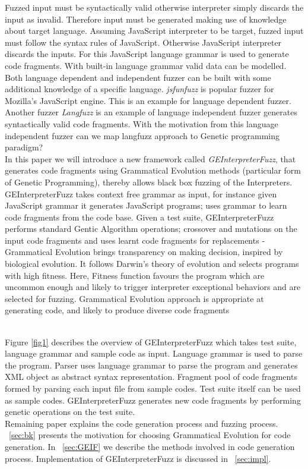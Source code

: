 \documentclass{sig-alternate}
\begin{document}
\indent Fuzzed input must be syntactically valid otherwise interpreter simply discards the input as invalid. Therefore input must be generated making use of knowledge about target language. Assuming JavaScript interpreter to be target, fuzzed input must follow the syntax rules of JavaScript. Otherwise JavaScript interpreter discards the inputs. For this JavaScript language grammar is used to generate code fragments. With built-in language grammar valid data can be modelled. Both language dependent and independent fuzzer can be built with some additional knowledge of a specific language. \textit{jsfunfuzz} is popular fuzzer for Mozilla's JavaScript engine. This is an example for language dependent fuzzer. Another fuzzer \textit{Langfuzz} is an example of language independent fuzzer generates syntactically valid code fragments. With the motivation from this language independent fuzzer can we map langfuzz approach to Genetic programming paradigm?\\
\indent In this paper we will introduce a new framework called \textit{GEInterpreterFuzz}, that generates code fragments using Grammatical Evolution methods (particular form of Genetic Programming), thereby allows black box fuzzing of the Interpreters. GEInterpreterFuzz takes context free grammar as input, for instance given JavaScript grammar it generates JavaScript programs; uses grammar to learn code fragments from the code base. Given a test suite, GEInterpreterFuzz performs standard Gentic Algorithm  operations; crossover and mutations on the input code fragments and uses learnt code fragments for replacements - Grammatical Evolution brings transparency on making decision, inspired by biological evolution. It follows Darwin's theory of evolution and selects programs with high fitness. Here, Fitness function favours  the program which are uncommon enough and likely to trigger interpreter exceptional behaviors and are selected for fuzzing. Grammatical Evolution approach is appropriate at generating code, and likely to produce diverse code fragments
\begin{figure*}
\centering
{}
\caption{Overview of GEInterpreterFuzz Approach.}
\label{fig1}
\end{figure*}
\\\indent  Figure \ref{fig1} describes the overview of GEInterpreterFuzz which takes test suite, language grammar and sample code as input. Language grammar is used to parse the program. Parser uses language grammar to parse the program and generates XML object as abstract syntax representation. Fragment pool of code fragments formed by parsing each input file from sample codes. Test suite itself can be used as sample codes. GEInterpreterFuzz generates new code fragments by performing genetic operations on the test suite. 
\\Remaining paper explains the code generation process and fuzzing process. ~\autoref{sec:bk} presents the motivation for choosing Grammatical Evolution for code generation. In ~\autoref{sec:GEIF} we describe the methods involved in code generation process. Implementation of GEInterpreterFuzz is discussed in ~\autoref{sec:impl}.
\end{document}
